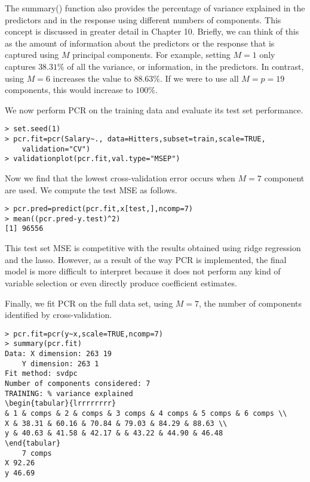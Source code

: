 \documentclass[10pt]{article}
\begin{document}
The summary() function also provides the percentage of variance explained in the predictors and in the response using different numbers of components. This concept is discussed in greater detail in Chapter 10. Briefly, we can think of this as the amount of information about the predictors or the response that is captured using $M$ principal components. For example, setting $M=1$ only captures $38.31 \%$ of all the variance, or information, in the predictors. In contrast, using $M=6$ increases the value to $88.63 \%$. If we were to use all $M=p=19$ components, this would increase to $100 \%$.

We now perform PCR on the training data and evaluate its test set performance.

\begin{verbatim}
> set.seed(1)
> pcr.fit=pcr(Salary~., data=Hitters,subset=train,scale=TRUE,
    validation="CV")
> validationplot(pcr.fit,val.type="MSEP")
\end{verbatim}

Now we find that the lowest cross-validation error occurs when $M=7$ component are used. We compute the test MSE as follows.

\begin{verbatim}
> pcr.pred=predict(pcr.fit,x[test,],ncomp=7)
> mean((pcr.pred-y.test)^2)
[1] 96556
\end{verbatim}

This test set MSE is competitive with the results obtained using ridge regression and the lasso. However, as a result of the way PCR is implemented, the final model is more difficult to interpret because it does not perform any kind of variable selection or even directly produce coefficient estimates.

Finally, we fit PCR on the full data set, using $M=7$, the number of components identified by cross-validation.

\begin{verbatim}
> pcr.fit=pcr(y~x,scale=TRUE,ncomp=7)
> summary(pcr.fit)
Data: X dimension: 263 19
    Y dimension: 263 1
Fit method: svdpc
Number of components considered: 7
TRAINING: % variance explained
\begin{tabular}{lrrrrrrrr} 
& 1 & comps & 2 & comps & 3 comps & 4 comps & 5 comps & 6 comps \\
X & 38.31 & 60.16 & 70.84 & 79.03 & 84.29 & 88.63 \\
y & 40.63 & 41.58 & 42.17 & & 43.22 & 44.90 & 46.48
\end{tabular}
    7 comps
X 92.26
y 46.69
\end{verbatim}
\end{document}
